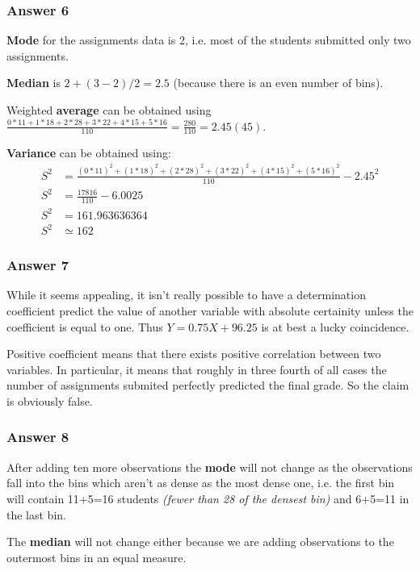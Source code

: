 \documentclass[11pt]{article}
\begin{document}
\subsubsection{Answer 6}
\label{sec-1-2-2}
\textbf{Mode} for the assignments data is 2, i.e. most of the students submitted
only two assignments.

\textbf{Median} is $2+(3-2)/2=2.5$ (because there is an even number of bins).

Weighted \textbf{average} can be obtained using
$\frac{0*11+1*18+2*28+3*22+4*15+5*16}{110}=\frac{280}{110}=2.45(45)$.

\textbf{Variance} can be obtained using:
\begin{equation*}
  \begin{aligned}
    S^2 &= \frac{(0 * 11)^2 + (1 * 18)^2 + (2 * 28)^2 +
      (3 * 22)^2 + (4 * 15)^2 + (5 * 16)^2}{110} - 2.45^2 \\
    S^2 &= \frac{17816}{110} - 6.0025 \\
    S^2 &= 161.963636364 \\
    S^2 &\simeq 162
  \end{aligned}
\end{equation*}

\subsubsection{Answer 7}
\label{sec-1-2-3}
While it seems appealing, it isn't really possible to have a determination
coefficient predict the value of another variable with absolute certainity
unless the coefficient is equal to one.  Thus $Y = 0.75X + 96.25$ is at best
a lucky coincidence.

Positive coefficient means that there exists positive correlation between
two variables.  In particular, it means that roughly in three fourth of all
cases the number of assignments submited perfectly predicted the final grade.
So the claim is obviously false.
\subsubsection{Answer 8}
\label{sec-1-2-4}
After adding ten more observations the \textbf{mode} will not change as the
observations fall into the bins which aren't as dense as the most dense one,
i.e. the first bin will contain 11+5=16 students
\emph{(fewer than 28 of the densest bin)} and 6+5=11 in the last bin.

The \textbf{median} will not change either because we are adding observations to
the outermost bins in an equal measure.
\end{document}
